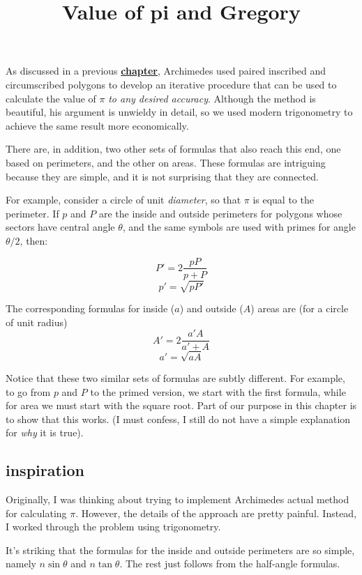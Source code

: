\documentclass[11pt, oneside]{article}
\title{Value of pi and Gregory}
\date{}
\begin{document}
\maketitle
\Large
\label{sec:Gregory}

As discussed in a previous \hyperref[sec:Value_of_pi]{\textbf{chapter}}, Archimedes used paired inscribed and circumscribed polygons to develop an iterative procedure that can be used to calculate the value of $\pi$ \emph{to any desired accuracy}.  Although the method is beautiful, his argument is unwieldy in detail, so we used modern trigonometry to achieve the same result more economically.

There are, in addition, two other sets of formulas that also reach this end, one based on perimeters, and the other on areas.  These formulas are intriguing because they are simple, and it is not surprising that they are connected.  

For example, consider a circle of unit \emph{diameter}, so that $\pi$ is equal to the perimeter.  If $p$ and $P$ are the inside and outside perimeters for polygons whose sectors have central angle $\theta$, and the same symbols are used with primes for angle $\theta/2$, then:

\[ P' = 2 \frac{pP}{p + P} \]
\[ p' = \sqrt{pP'} \]

The corresponding formulas for inside ($a$) and outside ($A$) areas are (for a circle of unit radius)
\[ A' = 2 \frac{a'A}{a' + A} \]
\[ a' = \sqrt{aA} \]

Notice that these two similar sets of formulas are subtly different.  For example, to go from $p$ and $P$ to the primed version, we start with the first formula, while for area we must start with the square root.  Part of our purpose in this chapter is to show that this works.  (I must confess, I still do not have a simple explanation for \emph{why} it is true).

\subsection*{inspiration}

Originally, I was thinking about trying to implement Archimedes actual method for calculating $\pi$.  However,  the details of the approach are pretty painful.  Instead, I worked through the problem using trigonometry.  

It's striking that the formulas for the inside and outside perimeters are so simple, namely $n \sin \theta$ and $n \tan \theta$.  The rest just follows from the half-angle formulas.
\end{document}
